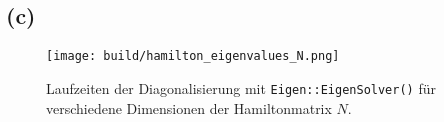 \documentclass{scrartcl}
\begin{document}
\subsection*{(c)}
\begin{figure}[ht]
  \centering
  \texttt{[image: build/hamilton\_eigenvalues\_N.png]}
  \caption{%
    Laufzeiten der Diagonalisierung mit \texttt{Eigen::EigenSolver()} für verschiedene Dimensionen der Hamiltonmatrix $N$.
  }%
  \label{fig:build/hamilton_eigenvalues_N}
\end{figure}
\end{document}
